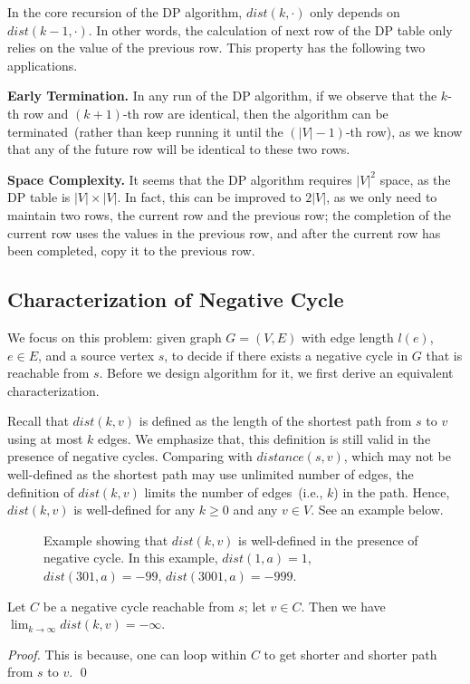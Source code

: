 In the core recursion of the DP algorithm,
$dist(k,\cdot)$ only depends on $dist(k - 1, \cdot)$.
In other words, the calculation of next row of the DP table
only relies on the value of the previous row.
This property has the following two applications.

{\bf Early Termination.} In any run of the DP algorithm, if we observe
that the $k$-th row and $(k+1)$-th row are identical,
then the algorithm can be terminated~(rather than keep running it until the $(|V|-1)$-th row),
as we know that any of the future row will be identical to these two rows.

{\bf Space Complexity.} It seems that the DP algorithm requires $|V|^2$ space,
as the DP table is $|V|\times |V|$.
In fact, this can be improved to $2|V|$,
as we only need to maintain two rows, the current row and
the previous row; the completion of the current row uses the values 
in the previous row, and after the current row has been completed,
copy it to the previous row.

\subsection*{Characterization of Negative Cycle}

We focus on this problem: given graph $G = (V,E)$ with edge length $l(e)$, $e\in E$, and
a source vertex $s$, to decide if there exists a negative cycle in $G$ that is reachable from $s$.
Before we design algorithm for it,
we first derive an equivalent characterization.

Recall that $dist(k,v)$ is defined as the length of the shortest path from $s$ to $v$ using
at most $k$ edges. We emphasize that, this definition is still valid in the presence of negative cycles.
Comparing with $distance(s,v)$, which may not be well-defined as the shortest path may use unlimited
number of edges, the definition of $dist(k,v)$ limits the number of edges~(i.e., $k$) in the path.
Hence, $dist(k,v)$ is well-defined for any $k\ge 0$ and any $v\in V$. See an example below.

\begin{figure}[h]
\centering{}
\caption{Example showing that $dist(k,v)$ is well-defined in the presence of negative cycle.
In this example, $dist(1,a) = 1$, $dist(301,a) = -99$, $dist(3001,a) = -999$.}
\end{figure}

\begin{fact}
Let $C$ be a negative cycle reachable from $s$;
let $v\in C$. Then we have $\lim_{k\to\infty} dist(k,v) = -\infty$.
\end{fact}
\emph{Proof.} This is because, one can loop within $C$ to get shorter and shorter path from $s$ to $v$. \qed


